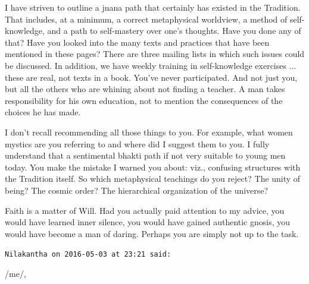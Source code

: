 \begin{footnotesize}
\begin{sffamily}
I have striven to outline a jnana path that certainly has existed in the Tradition. That includes, at a minimum, a correct metaphysical worldview, a method of self-knowledge, and a path to self-mastery over one's thoughts. Have you done any of that? Have you looked into the many texts and practices that have been mentioned in these pages? There are three mailing lists in which such issues could be discussed. In addition, we have weekly training in self-knowledge exercises ... these are real, not texts in a book. You've never participated. And not just you, but all the others who are whining about not finding a teacher. A man takes responsibility for his own education, not to mention the consequences of the choices he has made.

I don't recall recommending all those things to you. For example, what women mystics are you referring to and where did I suggest them to you. I fully understand that a sentimental bhakti path if not very suitable to young men today. You make the mistake I warned you about: viz., confusing structures with the Tradition itself. So which metaphysical teachings do you reject? The unity of being? The cosmic order? The hierarchical organization of the universe?

Faith is a matter of Will. Had you actually paid attention to my advice, you would have learned inner silence, you would have gained authentic gnosis, you would have become a man of daring. Perhaps you are simply not up to the task.

\hfill

\texttt{Nilakantha on 2016-05-03 at 23:21 said:}

/me/,


\end{sffamily}
\end{footnotesize}
